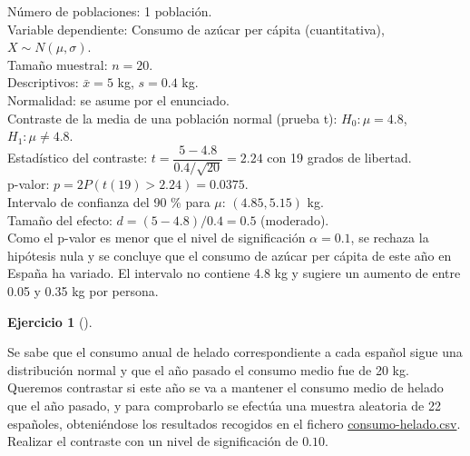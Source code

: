 \documentclass[
  spanish,
  a4paper,
]{scrreport}
\theoremstyle{definition}
\newtheorem{exercise}{Ejercicio}[chapter]
\theoremstyle{remark}
\begin{document}
\begin{tcolorbox}[enhanced jigsaw, arc=.35mm, bottomrule=.15mm, bottomtitle=1mm, breakable, colback=white, colbacktitle=quarto-callout-tip-color!10!white, colframe=quarto-callout-tip-color-frame, coltitle=black, left=2mm, leftrule=.75mm, opacityback=0, opacitybacktitle=0.6, rightrule=.15mm, title=\textcolor{quarto-callout-tip-color}{\faLightbulb}\hspace{0.5em}{Solución}, titlerule=0mm, toprule=.15mm, toptitle=1mm]

Número de poblaciones: 1 población.\\
Variable dependiente: Consumo de azúcar per cápita (cuantitativa),
\(X\sim N(\mu,\sigma)\).\\
Tamaño muestral: \(n=20\).\\
Descriptivos: \(\bar x=5\) kg, \(s=0.4\) kg.\\
Normalidad: se asume por el enunciado.\\
Contraste de la media de una población normal (prueba t):
\(H_0:\mu=4.8\), \(H_1:\mu\neq 4.8\).\\
Estadístico del contraste: \(t=\dfrac{5-4.8}{0.4/\sqrt{20}}=2.24\) con
19 grados de libertad.\\
p-valor: \(p=2P(t(19)>2.24)=0.0375\).\\
Intervalo de confianza del 90 \% para \(\mu\): \((4.85, 5.15)\) kg.\\
Tamaño del efecto: \(d=(5-4.8)/0.4=0.5\) (moderado).\\
Como el p-valor es menor que el nivel de significación \(\alpha=0.1\),
se rechaza la hipótesis nula y se concluye que el consumo de azúcar per
cápita de este año en España ha variado. El intervalo no contiene 4.8 kg
y sugiere un aumento de entre 0.05 y 0.35 kg por persona.

\end{tcolorbox}

\begin{exercise}[]\protect\hypertarget{exr-contraste-media-consumo}{}\label{exr-contraste-media-consumo}

Se sabe que el consumo anual de helado correspondiente a cada español
sigue una distribución normal y que el año pasado el consumo medio fue
de 20 kg. Queremos contrastar si este año se va a mantener el consumo
medio de helado que el año pasado, y para comprobarlo se efectúa una
muestra aleatoria de 22 españoles, obteniéndose los resultados recogidos
en el fichero \href{datos/consumo-helado.csv}{consumo-helado.csv}.
Realizar el contraste con un nivel de significación de \(0.10\).

\end{exercise}
\end{document}
